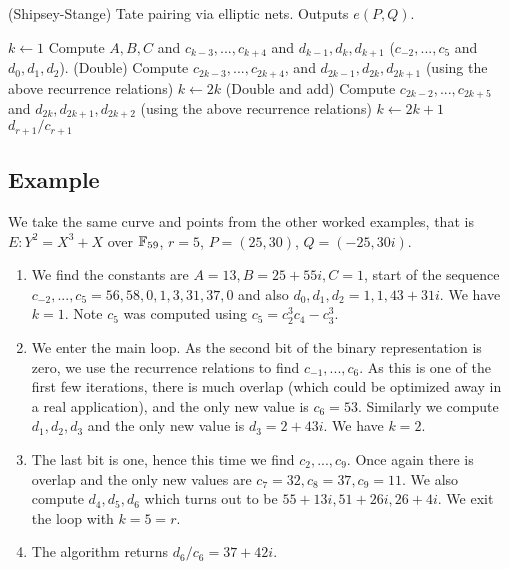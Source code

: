 \begin{algorithm}
\caption{(Shipsey-Stange) Tate pairing via elliptic nets. Outputs
$e(P,Q)$.}
\begin{algorithmic}[1]
\STATE $k \gets 1$
\STATE
Compute $A, B, C$ and $c_{k-3},...,c_{k+4}$ and $d_{k-1}, d_k, d_{k+1}$
($c_{-2}, ..., c_{5}$ and $ d_0, d_1, d_2$).
    \STATE (Double)
Compute $c_{2k-3},...,c_{2k+4}$, and $d_{2k-1}, d_{2k}, d_{2k+1}$
(using the above recurrence relations)
    \STATE $k \gets 2k$
    \ELSE[$r_j = 1$]
    \STATE (Double and add)
Compute $c_{2k-2},...,c_{2k+5}$ and  $d_{2k}, d_{2k+1}, d_{2k+2}$
(using the above recurrence relations)
\STATE $k \gets 2k + 1$
    \ENDIF
\ENDFOR
\RETURN $d_{r+1}/c_{r+1}$
\end{algorithmic}
\end{algorithm}

\subsection {Example}
We take the same curve and points from the other worked examples, that is
$E : Y^2 = X^3 + X$ over $\mathbb{F}_{59}$, $r = 5$,
$P = (25, 30)$, $Q = (-25, 30i)$.

\begin{enumerate}
\item
We find the constants are $A = 13, B = 25+55i, C = 1$,
start of the sequence $c_{-2}, ..., c_5 = 
56, 58, 0, 1, 3, 31, 37, 0$ and also $d_0, d_1, d_2 = 1, 1, 43+31i$.
We have $k = 1$. Note $c_5$ was computed using
$c_5 = c_2^3 c_4 - c_3^3$.
\item
We enter the main loop. As the second bit of the binary representation is
zero, we use the recurrence relations to find
$c_{-1}, ..., c_6$. As this is one of the first few iterations,
there is much overlap (which could be optimized away
in a real application), and the only new value is $c_6 = 53$. Similarly
we compute $d_1,d_2,d_3$ and the only new value is $d_3 = 2+43i$.
We have $k = 2$.
\item
The last bit is one, hence this time we find
$c_2, ..., c_9$. Once again there is overlap and the only new values
are $c_7 = 32, c_8 = 37, c_9 = 11$.
We also compute $d_4, d_5, d_6$ which turns out to be $55+13i, 51+26i, 26+4i$.
We exit the loop with $k = 5 = r$.
\item
The algorithm returns $d_6/c_6 = 37+42i$.
\end{enumerate}

